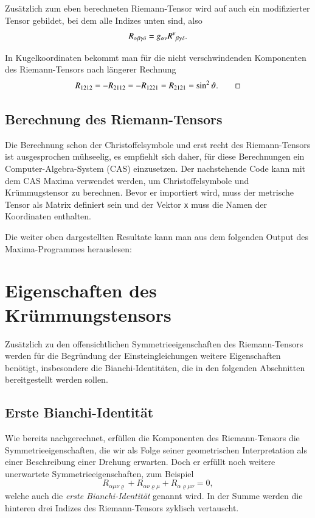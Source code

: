 Zusätzlich zum eben berechneten Riemann-Tensor wird auf auch ein
modifizierter Tensor gebildet, bei dem alle Indizes unten sind,
also
\[
R_{\alpha\beta\gamma\delta} = g_{\alpha\nu}R^\nu\mathstrut_{\beta\gamma\delta}.
\]

\begin{beispiel}
In Kugelkoordinaten bekommt man für die nicht verschwindenden Komponenten
des Rie\-mann-Tensors nach längerer Rechnung
\[
R_{1212}
=
-R_{2112}
=
-R_{1221}
=
R_{2121}
=
\sin^2\vartheta.
\qedhere
\]
\end{beispiel}

\subsection{Berechnung des Riemann-Tensors}
Die Berechnung schon der Christoffelsymbole und erst recht des
Riemann-Tensors ist ausgesprochen mühseelig, es empfiehlt sich
daher, für diese Berechnungen ein Computer-Algebra-System (CAS) einzusetzen.
Der nachstehende Code kann mit dem CAS Maxima verwendet werden, um
Christoffelsymbole und Krümmugstensor zu berechnen.
Bevor er importiert wird, muss der metrische Tensor als Matrix
definiert sein und der Vektor {\tt x} muss die Namen der Koordinaten
enthalten.


\label{skript:maxima:curvature}

Die weiter oben dargestellten Resultate kann man aus dem folgenden Output
des Maxima-Programmes herauslesen:
{\small

}

\section{Eigenschaften des Krümmungstensors}
Zusätzlich zu den offensichtlichen Symmetrieeigenschaften des Riemann-Tensors
werden für die Begründung der Einsteingleichungen weitere Eigenschaften
benötigt, insbesondere die Bianchi-Identitäten, die in den folgenden
Abschnitten bereitgestellt werden sollen.

\subsection{Erste Bianchi-Identität}
Wie bereits nachgerechnet, erfüllen die Komponenten des Riemann-Tensors
die Symmetrieeigenschaften, die wir als Folge seiner geometrischen
Interpretation als einer Beschreibung einer Drehung erwarten.
Doch er erfüllt noch weitere unerwartete Symmetrieeigenschaften, zum
Beispiel
\begin{equation}
R_{\alpha\mu\nu\varrho}
+
R_{\alpha\nu\varrho\mu}
+
R_{\alpha\varrho\mu\nu}
=0,
\label{skript:kruemmung:bianchi1}
\end{equation}
welche auch die {\em erste Bianchi-Identität} genannt wird.
%
In der Summe werden die hinteren drei Indizes des Riemann-Tensors
zyklisch vertauscht.

